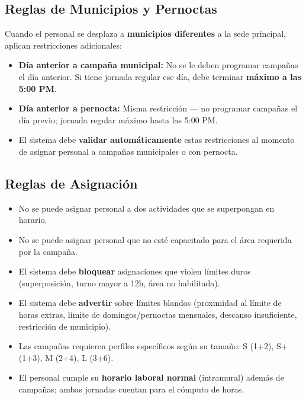 \documentclass[10pt,a4paper]{article}
\begin{document}
\subsection{Reglas de Municipios y Pernoctas}

Cuando el personal se desplaza a \textbf{municipios diferentes} a la sede principal, aplican restricciones adicionales:

\begin{itemize}[leftmargin=2em]
    \item \textbf{D\'{i}a anterior a campaña municipal:} No se le deben programar campañas el d\'{i}a anterior. Si tiene jornada regular ese d\'{i}a, debe terminar \textbf{m\'{a}ximo a las 5:00 PM}.
    \item \textbf{D\'{i}a anterior a pernocta:} Misma restricci\'{o}n --- no programar campañas el d\'{i}a previo; jornada regular m\'{a}ximo hasta las 5:00 PM.
    \item El sistema debe \textbf{validar autom\'{a}ticamente} estas restricciones al momento de asignar personal a campañas municipales o con pernocta.
\end{itemize}

\subsection{Reglas de Asignaci\'{o}n}

\begin{itemize}[leftmargin=2em]
    \item No se puede asignar personal a dos actividades que se superpongan en horario.
    \item No se puede asignar personal que no est\'{e} capacitado para el \'{a}rea requerida por la campaña.
    \item El sistema debe \textbf{bloquear} asignaciones que violen l\'{i}mites duros (superposici\'{o}n, turno mayor a 12h, \'{a}rea no habilitada).
    \item El sistema debe \textbf{advertir} sobre l\'{i}mites blandos (proximidad al l\'{i}mite de horas extras, l\'{i}mite de domingos/pernoctas mensuales, descanso insuficiente, restricci\'{o}n de municipio).
    \item Las campañas requieren perfiles espec\'{i}ficos seg\'{u}n su tamaño: S (1+2), S+ (1+3), M (2+4), L (3+6).
    \item El personal cumple su \textbf{horario laboral normal} (intramural) adem\'{a}s de campañas; ambas jornadas cuentan para el c\'{o}mputo de horas.
\end{itemize}
\end{document}
